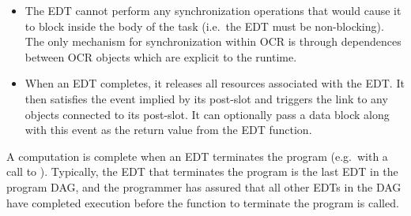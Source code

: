\begin{itemize}
\begin{description}
\end{description}

\item The EDT cannot perform any synchronization operations that would
cause it to block inside the body of the task (i.e.\ the EDT must be
non-blocking). The only mechanism for synchronization within OCR is
through dependences between OCR objects which are explicit to the
runtime.

\item When an EDT completes, it releases all resources associated with
the EDT. It then satisfies the event implied by its post-slot and
triggers the link to any objects connected to its post-slot. It can
optionally pass a data block along with this event as the return value
from the EDT function.
\end{itemize}

A computation is complete when an EDT terminates the program
(e.g.\ with a call to ). Typically, the EDT that
terminates the program is the last EDT in the program DAG, and the
programmer has assured that all other EDTs in the DAG have completed
execution before the function to terminate the program is called.

